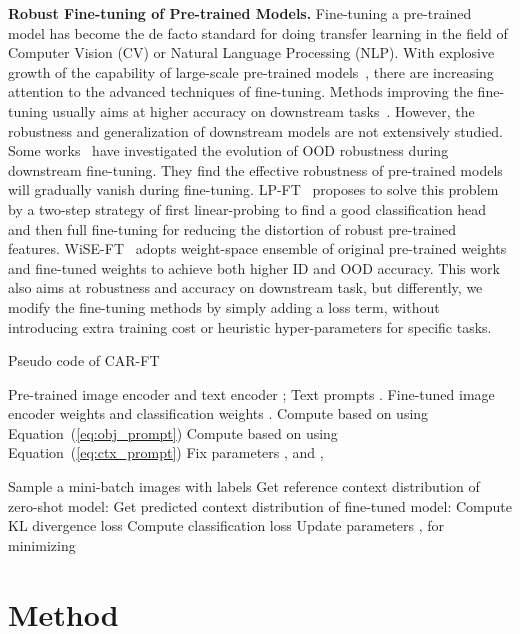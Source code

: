 \documentclass[pdflatex,sn-basic,iicol]{sn-jnl}
\theoremstyle{thmstyleone}\newtheorem{theorem}{Theorem}\newtheorem{proposition}[theorem]{Proposition}
\theoremstyle{thmstyletwo}\newtheorem{example}{Example}\newtheorem{remark}{Remark}
\theoremstyle{thmstylethree}\newtheorem{definition}{Definition}
\begin{document}
\noindent\textbf{Robust Fine-tuning of Pre-trained Models.} Fine-tuning a pre-trained model has become the de facto standard for doing transfer learning in the field of Computer Vision (CV) or Natural Language Processing (NLP). With explosive growth of the capability of large-scale pre-trained models~\citep{radford2021learning}, there are increasing attention to the advanced techniques of fine-tuning. Methods improving the fine-tuning usually aims at higher accuracy on downstream tasks~\citep{ge2017borrowing,guo2019spottune}. However, the robustness and generalization of downstream models are not extensively studied. Some works~\citep{kumar2021fine,wortsman2022robust,andreassen2021evolution} have investigated the evolution of OOD robustness during downstream fine-tuning. They find the effective robustness of pre-trained models will gradually vanish during fine-tuning. LP-FT~\citep{kumar2021fine} proposes to solve this problem by a two-step strategy of first linear-probing to find a good classification head and then full fine-tuning for reducing the distortion of robust pre-trained features. WiSE-FT~\citep{wortsman2022robust} adopts weight-space ensemble of original pre-trained weights and fine-tuned weights to achieve both higher ID and OOD accuracy. This work also aims at robustness and accuracy on downstream task, but differently, we modify the fine-tuning methods by simply adding a loss term, without introducing extra training cost or heuristic hyper-parameters for specific tasks. 


\begin{algorithm*}[ht]
\caption{Pseudo code of CAR-FT}
\begin{algorithmic}[1]
\Require 
Pre-trained image encoder  and text encoder ; Text prompts .
\Ensure
Fine-tuned image encoder weights  and classification weights .
\State Compute  based on  using Equation~(\ref{eq:obj_prompt})
\State Compute  based on  using Equation~(\ref{eq:ctx_prompt})
\State Fix parameters ,  and 
\State , 

\State Sample a mini-batch images  with
labels 
\State Get reference context distribution of zero-shot model: 
\State Get predicted context distribution of fine-tuned model: 
\State Compute KL divergence loss 
\State Compute classification loss 
\State  \hfill
\State Update parameters ,  for minimizing 
\\ 
\EndFor
\end{algorithmic}
\label{alg:carft}
\end{algorithm*}
\section{Method}
\end{document}
